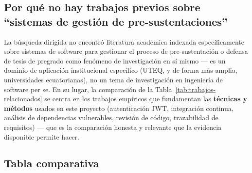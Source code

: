 \subsection{Por qué no hay trabajos previos sobre ``sistemas de gestión de pre-sustentaciones''}

La búsqueda dirigida no encontró literatura académica indexada específicamente sobre sistemas de software
para gestionar el proceso de pre-sustentación o defensa de tesis de pregrado como fenómeno de
investigación en sí mismo --- es un dominio de aplicación institucional específico (UTEQ, y de forma más
amplia, universidades ecuatorianas), no un tema de investigación en ingeniería de software per se. En su
lugar, la comparación de la Tabla~\ref{tab:trabajos-relacionados} se centra en los trabajos empíricos que
fundamentan las \textbf{técnicas y métodos} usados en este proyecto (autenticación JWT, integración
continua, análisis de dependencias vulnerables, revisión de código, trazabilidad de requisitos) ---
que es la comparación honesta y relevante que la evidencia disponible permite hacer.

\subsection{Tabla comparativa}

